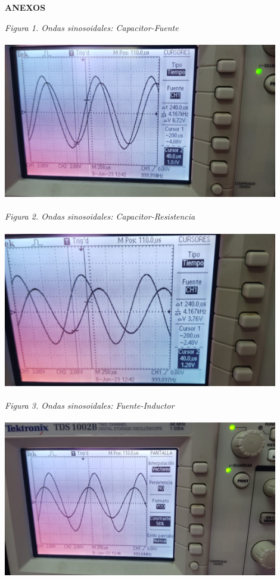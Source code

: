 \documentclass[12pt]{article}
\begin{document}
	\newpage
	
	\begin{center}
		\textbf{\large ANEXOS}\\
	\end{center}
	
	\textit{Figura 1. Ondas sinosoidales: Capacitor-Fuente}
	\begin{center}
		\includegraphics[width=12cm,height=7cm]{Img/lab_5_img_12}
	\end{center}
	
	\vspace{2cm}
	
	\textit{Figura 2. Ondas sinosoidales: Capacitor-Resistencia}
	\begin{center}
		\includegraphics[width=12cm,height=7cm]{Img/lab_5_img_13}
	\end{center}
	
	\newpage
	
	\textit{Figura 3. Ondas sinosoidales: Fuente-Inductor}
	\begin{center}
		\includegraphics[width=12cm,height=7cm]{Img/lab_5_img_15}
	\end{center}
	
\end{document}
